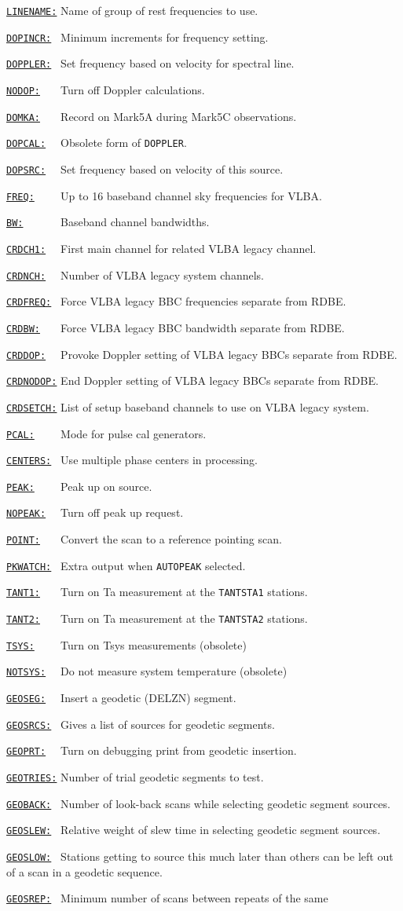 \documentclass{report}
\newcommand{\htlm}[2]%
{\item
  \hyperref[MP:#1]{{\tt #1:}}{\tt #2}%
}
\newcommand{\htln}[3]%
{\item
  \hyperref[MP:#2]{{\tt #1:}}{\tt #3}%
}
\begin{document}
\begin{list}{}{\parsep 0em  \itemsep 0em }
\htlm{LINENAME}{} Name of group of rest frequencies to use.
\htlm{DOPINCR}{~} Minimum increments for frequency setting.
\htlm{DOPPLER}{~} Set frequency based on velocity for
                        spectral line.
\htln{NODOP}{DOPPLER}{~~~} Turn off Doppler calculations.
\htlm{DOMKA}{~~~} Record on Mark5A during Mark5C observations.
\htlm{DOPCAL}{~~} Obsolete form of {\tt DOPPLER}.
\htlm{DOPSRC}{~~} Set frequency based on velocity of this source.
\htlm{FREQ}{~~~~} Up to 16 baseband channel sky frequencies for
                        VLBA.
\htlm{BW}{~~~~~~}       Baseband channel bandwidths.
\htlm{CRDCH1}{~~} First main channel for related VLBA legacy channel.
\htlm{CRDNCH}{~~} Number of VLBA legacy system channels.
\htlm{CRDFREQ}{~} Force VLBA legacy BBC frequencies separate from RDBE.
\htlm{CRDBW}{~~~} Force VLBA legacy BBC bandwidth separate from RDBE.
\htln{CRDDOP}{CRDDOP}{~~} Provoke Doppler setting of VLBA legacy 
                         BBCs separate from RDBE.
\htln{CRDNODOP}{CRDDOP}{} End Doppler setting of VLBA legacy 
                         BBCs separate from RDBE.
\htlm{CRDSETCH}{} List of setup baseband channels to use on VLBA legacy 
                         system.
\htlm{PCAL}{~~~~} Mode for pulse cal generators.
\htlm{CENTERS}{~} Use multiple phase centers in processing.
\htlm{PEAK}{~~~~} Peak up on source.
\htln{NOPEAK}{PEAK}{~~} Turn off peak up request.
\htlm{POINT}{~~~} Convert the scan to a reference pointing scan.
\htlm{PKWATCH}{~} Extra output when {\tt AUTOPEAK} selected.
\htlm{TANT1}{~~~} Turn on Ta measurement at the {\tt TANTSTA1}
                         stations.
\htln{TANT2}{TANT1}{~~~} Turn on Ta measurement at the {\tt TANTSTA2}
                        stations.
\htlm{TSYS}{~~~~} Turn on Tsys measurements (obsolete)
\htln{NOTSYS}{TSYS}{~~} Do not measure system temperature (obsolete)
\htlm{GEOSEG}{~~} Insert a geodetic (DELZN) segment.
\htlm{GEOSRCS}{~} Gives a list of sources for geodetic segments.
\htlm{GEOPRT}{~~} Turn on debugging print from geodetic insertion.
\htlm{GEOTRIES}{} Number of trial geodetic segments to test.
\htlm{GEOBACK}{~} Number of look-back scans while selecting geodetic
                     segment sources.
\htlm{GEOSLEW}{~} Relative weight of slew time in selecting geodetic
                     segment sources.
\htlm{GEOSLOW}{~} Stations getting to source this much later than others
                     can be left out of a scan in a geodetic sequence.
\htlm{GEOSREP}{~} Minimum number of scans between repeats of the same

\end{list}
\end{document}
